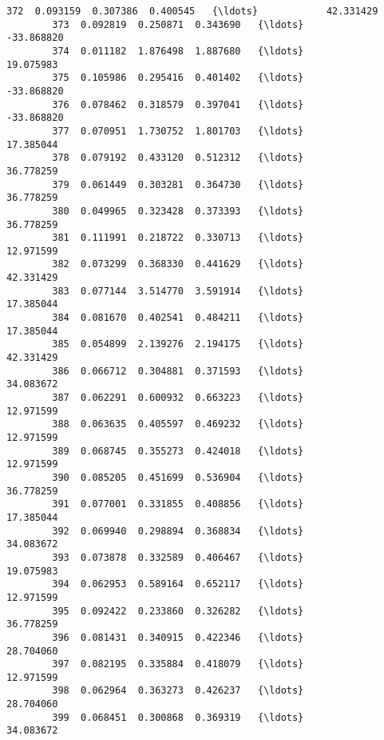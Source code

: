 \documentclass[11pt]{article}
\begin{document}
\begin{Verbatim}[commandchars=\\\{\}]
        372  0.093159  0.307386  0.400545   {\ldots}            42.331429   
        373  0.092819  0.250871  0.343690   {\ldots}           -33.868820   
        374  0.011182  1.876498  1.887680   {\ldots}            19.075983   
        375  0.105986  0.295416  0.401402   {\ldots}           -33.868820   
        376  0.078462  0.318579  0.397041   {\ldots}           -33.868820   
        377  0.070951  1.730752  1.801703   {\ldots}            17.385044   
        378  0.079192  0.433120  0.512312   {\ldots}            36.778259   
        379  0.061449  0.303281  0.364730   {\ldots}            36.778259   
        380  0.049965  0.323428  0.373393   {\ldots}            36.778259   
        381  0.111991  0.218722  0.330713   {\ldots}            12.971599   
        382  0.073299  0.368330  0.441629   {\ldots}            42.331429   
        383  0.077144  3.514770  3.591914   {\ldots}            17.385044   
        384  0.081670  0.402541  0.484211   {\ldots}            17.385044   
        385  0.054899  2.139276  2.194175   {\ldots}            42.331429   
        386  0.066712  0.304881  0.371593   {\ldots}            34.083672   
        387  0.062291  0.600932  0.663223   {\ldots}            12.971599   
        388  0.063635  0.405597  0.469232   {\ldots}            12.971599   
        389  0.068745  0.355273  0.424018   {\ldots}            12.971599   
        390  0.085205  0.451699  0.536904   {\ldots}            36.778259   
        391  0.077001  0.331855  0.408856   {\ldots}            17.385044   
        392  0.069940  0.298894  0.368834   {\ldots}            34.083672   
        393  0.073878  0.332589  0.406467   {\ldots}            19.075983   
        394  0.062953  0.589164  0.652117   {\ldots}            12.971599   
        395  0.092422  0.233860  0.326282   {\ldots}            36.778259   
        396  0.081431  0.340915  0.422346   {\ldots}            28.704060   
        397  0.082195  0.335884  0.418079   {\ldots}            12.971599   
        398  0.062964  0.363273  0.426237   {\ldots}            28.704060   
        399  0.068451  0.300868  0.369319   {\ldots}            34.083672   
        

\end{Verbatim}
\end{document}
